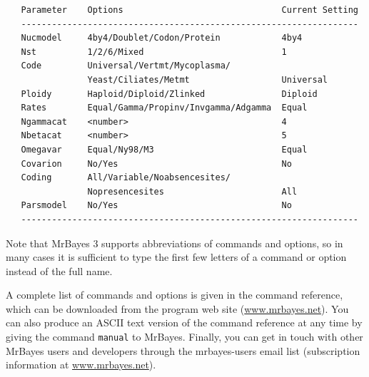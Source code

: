 \documentclass[12pt]{book}
\begin{document}
\begin{singlespacing}
\small
\begin{verbatim}
   Parameter    Options                               Current Setting            
   ------------------------------------------------------------------            
   Nucmodel     4by4/Doublet/Codon/Protein            4by4                         
   Nst          1/2/6/Mixed                           1                         
   Code         Universal/Vertmt/Mycoplasma/                                     
                Yeast/Ciliates/Metmt                  Universal                         
   Ploidy       Haploid/Diploid/Zlinked               Diploid                         
   Rates        Equal/Gamma/Propinv/Invgamma/Adgamma  Equal                         
   Ngammacat    <number>                              4                         
   Nbetacat     <number>                              5                         
   Omegavar     Equal/Ny98/M3                         Equal                         
   Covarion     No/Yes                                No                         
   Coding       All/Variable/Noabsencesites/                                     
                Nopresencesites                       All                         
   Parsmodel    No/Yes                                No                         
   ------------------------------------------------------------------            
\end{verbatim}
\normalsize
\end{singlespacing}

Note that MrBayes 3 supports abbreviations of commands and options, so in many cases it
is sufficient to type the first few letters of a command or option instead of the full name.

A complete list of commands and options is given in the command reference, which can
be downloaded from the program web site (\url{www.mrbayes.net}). You can also produce an
ASCII text version of the command reference at any time by giving the command
\texttt{manual} to MrBayes. Finally, you can get in
touch with other MrBayes users and developers through the mrbayes-users email list
(subscription information at \url{www.mrbayes.net}).
\end{document}
